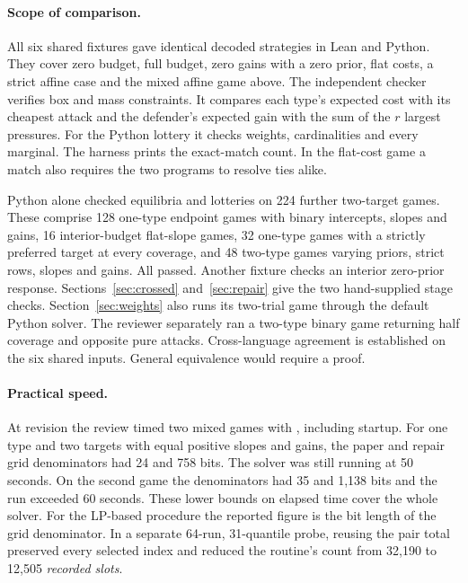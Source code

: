 \documentclass[11pt,letterpaper]{article}
\newcommand{\code}[1]{\textnormal{\texttt{\detokenize{#1}}}}
\begin{document}
\paragraph{Scope of comparison.}
All six shared fixtures gave identical decoded strategies in Lean and
Python. They cover zero budget, full budget, zero gains with a zero prior,
flat costs, a strict affine case and the mixed affine game above.
The independent checker verifies box and mass constraints. It compares
each type's expected cost with its cheapest attack and the defender's
expected gain with the sum of the $r$ largest pressures. For the Python
lottery it checks weights, cardinalities and every marginal. The harness
prints the exact-match count. In the flat-cost game a match also requires
the two programs to resolve ties alike. \cite{pythonrecord}

Python alone checked equilibria and lotteries on 224 further two-target
games. These comprise 128 one-type endpoint games with binary intercepts,
slopes and gains, 16 interior-budget flat-slope games, 32 one-type games
with a strictly preferred target at every coverage, and 48 two-type games varying priors,
strict rows, slopes and gains. All passed. Another fixture checks an
interior zero-prior response. Sections~\ref{sec:crossed} and~\ref{sec:repair}
give the two hand-supplied stage checks. Section~\ref{sec:weights} also
runs its two-trial game through the default Python solver. The reviewer
separately ran a two-type binary game returning half coverage and opposite
pure attacks. Cross-language agreement is established on the six shared
inputs. General equivalence would require a proof.
\cite{review,pythonrecord,pythonfollow}

\paragraph{Practical speed.}
At revision \code{4c397db} the review timed two mixed games with
\code{lake env lean}, including startup. For one type and two targets
with equal positive slopes and gains, the paper and repair grid
denominators had 24 and 758 bits. The solver was still running at
50 seconds. On the second game the denominators had 35 and 1,138 bits
and the run exceeded 60 seconds. These lower bounds on elapsed time
cover the whole solver. For the LP-based procedure the reported figure is
the bit length of the grid denominator.
In a separate 64-run, 31-quantile probe, reusing the pair total preserved
every selected index and reduced the routine's count from 32,190 to
12,505 \emph{recorded slots}. \cite{review,followup}
\end{document}
